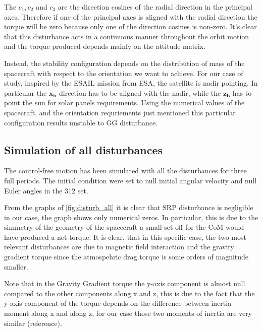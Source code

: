 The \( c_1, c_2 \) and \( c_3 \) are the direction cosines of the radial direction in the principal axes. 
Therefore if one of the principal axes is aligned with the radial direction the torque will be zero because only one of the direction cosines is non-zero.
It's clear that this disturbance acts in a continuous manner throughout the orbit motion and the torque produced depends mainly on the attitude matrix.

Instead, the stability configuration depends on the distribution of mass of the spacecraft with respect to the orientation we want to achieve. For our case of study, 
inspired by the ESAIL mission from ESA, the satellite is nadir pointing. In particular the $\boldsymbol{x_b}$ direction has to be aligned with the nadir, while the $\boldsymbol{z_b}$ has to point the sun for solar panels requirements. Using the numerical values of the spacecraft, and the orientation requriements just mentioned
this particular configuration results unstable to GG disturbance.


\subsection{Simulation of all disturbances}
\label{subsec:sim_disturbances}


The control-free motion has been simulated with all the disturbances for three full periods. 
The initial condition were set to null initial angular velocity and 
null Euler angles in the $312$ set.

From the graphs of \autoref{fig:disturb_all} it is clear that SRP disturbance is negligible
in our case, the graph shows only numerical zeros. In particular, this is due to the simmetry of 
the geometry of the spacecraft a small set off for the CoM would have produced a net torque. 
It is clear, that in this specific case, the two most relevant disturbances are due to magnetic field
interaction and the gravity gradient torque since the atmospehric drag torque is some orders of magnitude 
smaller.

Note that in the Gravity Gradient torque the y-axis component is almost null compared to the other 
components along x and z, this is due to the fact that the y-axis component of the torque depends on 
the difference between inertia moment along x and along z, for our case those two moments of inertia are 
very similar (reference). 